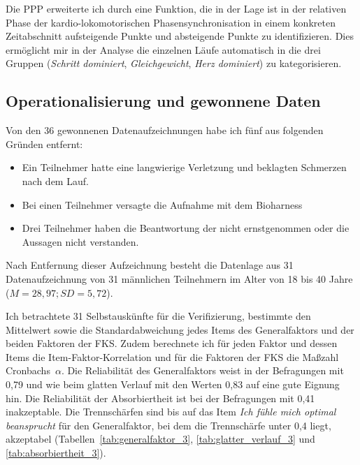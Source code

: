Die \ac{PPP} erweiterte ich durch eine Funktion, die in der Lage ist in der relativen Phase der kardio-lokomotorischen Phasensynchronisation in einem konkreten Zeitabschnitt aufsteigende Punkte und absteigende Punkte zu identifizieren. Dies ermöglicht mir in der Analyse die einzelnen Läufe automatisch in die drei Gruppen (\emph{Schritt dominiert}, \emph{Gleichgewicht}, \emph{Herz dominiert}) zu kategorisieren. 

\subsection{Operationalisierung und gewonnene Daten} 

\label{sub:operationalisierung_und_gewonnene_daten_5_3}

Von den 36 gewonnenen Datenaufzeichnungen habe ich fünf aus folgenden Gründen entfernt:
\begin{itemize}
	
	\item Ein Teilnehmer hatte eine langwierige Verletzung und beklagten Schmerzen nach dem Lauf.
	
	\item Bei einen Teilnehmer versagte die Aufnahme mit dem Bioharness
	
	\item Drei Teilnehmer haben die Beantwortung der nicht ernstgenommen oder die Aussagen nicht verstanden.
\end{itemize}

Nach Entfernung dieser Aufzeichnung besteht die Datenlage aus 31 Datenaufzeichnung von 31 männlichen Teilnehmern im Alter von 18 bis 40 Jahre ($M = 28{,}97; SD = 5{,}72$).

Ich betrachtete 31 Selbstauskünfte für die Verifizierung, bestimmte den Mittelwert sowie die Standardabweichung jedes Items des Generalfaktors und der beiden Faktoren der \ac{FKS}. Zudem berechnete ich für jeden Faktor und dessen Items die Item-Faktor-Korrelation und für die Faktoren der \ac{FKS} die Maßzahl Cronbachs~$\alpha$. Die Reliabilität des Generalfaktors weist in der Befragungen mit 0,79 und wie beim glatten Verlauf mit den Werten 0,83 auf eine gute Eignung hin. Die Reliabilität der Absorbiertheit ist bei der Befragungen mit 0,41 inakzeptable. Die Trennschärfen sind bis auf das Item \emph{Ich fühle mich optimal beansprucht} für den Generalfaktor, bei dem die Trennschärfe unter 0,4 liegt, akzeptabel (Tabellen~\ref{tab:generalfaktor_3}, \ref{tab:glatter_verlauf_3} und \ref{tab:absorbiertheit_3}).

